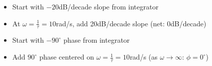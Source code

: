 \documentclass{book}
\begin{document}
\begin{minipage}{0.49\textwidth}
	\centering
	\begin{itemize}
		\item Start with $ -20 $dB/decade slope from integrator
		\item At $ \omega = \frac{1}{\tau} = 10 $rad/s, add 20dB/decade slope (net: 0dB/decade)
	\end{itemize}
\end{minipage}
\hfill
\begin{minipage}{0.49\textwidth}
	\centering
	\begin{itemize}
		\item Start with $ -90^\circ $ phase from integrator
		\item Add $ 90^\circ $ phase centered on $ \omega = \frac{1}{\tau} = 10 $rad/s (as $ \omega\to\infty $: $ \phi=0^\circ $)
	\end{itemize}
\end{minipage}
\end{document}
